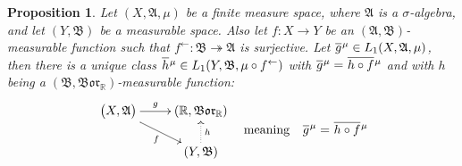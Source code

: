 \documentclass[
twoside=true,
paper=letter,
fontsize=9pt,
pagesize=auto,
leqno,
openany,
headsepline,
overfullrule,
]{scrbook}
\theoremstyle{plain}
\theoremstyle{plain}
\newtheorem{prop}[thm]{Proposition}
\theoremstyle{definition}
\theoremstyle{bfnoteitalic}
\theoremstyle{bfnoteroman}
\newcommand{\sigalg}[1]{\mathfrak{#1}}
\newcommand{\borel}{\mathfrak{Bor}}
\newcommand{\textsigma}{\hbox{\large{$\sigma$}}\kern-1pt}
\newcommand{\preimage}[1]{#1^{\leftarrow}}
\newcommand{\R}{\mathbb{R}}
\newcommand{\sigmaalgebra}{\sigalg{A}}
\newcommand{\sigmaalgebraii}{\sigalg{B}}
\newcommand{\measurespace}{X}
\newcommand{\measurespaceii}{Y}
\newcommand{\measure}{\mu}
\newcommand*\xbar[1]{%
   \hbox{%
     \vbox{%
       \hrule height 0.4pt %
       \kern0.4ex%
       \hbox{%
         \ensuremath{#1}%
       }%
     }%
   }%
}
\newcommand{\lebclass}[1]{\hspace{.5pt}\xbar{#1}\hspace{0.5pt}}
\newcommand{\ellclass}[2]{\lebclass{#1}^{#2}}
\begin{document}
\begin{prop}\label{factoring_functions}
Let $(\measurespace, \sigmaalgebra, \measure)$  be a finite measure space, where $\sigmaalgebra$ is a \textsigma-algebra, and let $(\measurespaceii, \sigmaalgebraii)$ be a measurable space.
Also let $f:\measurespace\to\measurespaceii$ be an $(\sigmaalgebra, \sigmaalgebraii)$\hyp{}measurable function such that 
$\preimage{f}:\sigmaalgebraii \twoheadrightarrow\sigmaalgebra$ is surjective.
Let
$\ellclass{g}{\measure}
\in L_1(\measurespace, \sigmaalgebra, \measure)$,
then there is a unique class
$\ellclass{h}{\measure}
\in L_1 (\measurespaceii, \sigmaalgebraii, \measure\circ\preimage{f})$
with 
$\ellclass{g}{\measure} 
= 
\ellclass{h\circ f}{\measure}$
and with $h$ being a $(\sigmaalgebraii, \borel_\R)$\hyp{}measurable function:
\[
\begin{gathered}
\xymatrix@R=16pt{ 
\bigl( \measurespace, \sigmaalgebra \bigr) \ar[r]^-{g} 
\ar[dr]_{f}
&
(\R,\borel_\R)  
\\
&
(\measurespaceii, \sigmaalgebraii) \ar@{.>}[u]_{h}
\\
}
\end{gathered}
\quad
\text{meaning}
\quad
\ellclass{g}{\measure}=\ellclass{h\circ f}{\measure}
\]
\end{prop}
\end{document}
